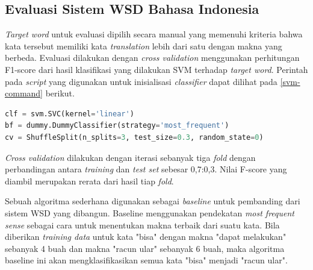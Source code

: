 \subsection{Evaluasi Sistem WSD Bahasa Indonesia}
\textit{Target word} untuk evaluasi dipilih secara manual yang memenuhi kriteria bahwa kata tersebut memiliki kata \textit{translation} lebih dari satu dengan makna yang berbeda. Evaluasi dilakukan dengan \textit{cross validation} menggunakan perhitungan F1-score dari hasil klasifikasi yang dilakukan SVM terhadap \textit{target word}. Perintah pada \textit{script} yang digunakan untuk inisialisasi \textit{classifier} dapat dilihat pada \ref{svm-command} berikut.

\begin{lstlisting}[language=python, caption={Perintah SVM, baseline, dan \textit{cross validation}}, label={svm-command}]
clf = svm.SVC(kernel='linear')
bf = dummy.DummyClassifier(strategy='most_frequent')
cv = ShuffleSplit(n_splits=3, test_size=0.3, random_state=0)
\end{lstlisting}


\textit{Cross validation} dilakukan dengan iterasi sebanyak tiga \textit{fold} dengan perbandingan antara \textit{training} dan \textit{test set} sebesar 0,7:0,3. Nilai F-score yang diambil merupakan rerata dari hasil tiap \textit{fold}.

Sebuah algoritma sederhana digunakan sebagai \textit{baseline} untuk pembanding dari sistem WSD yang dibangun. Baseline menggunakan pendekatan \textit{most frequent sense} sebagai cara untuk menentukan makna terbaik dari suatu kata. Bila diberikan \textit{training data} untuk kata "bisa" dengan makna "dapat melakukan" sebanyak 4 buah dan makna "racun ular" sebanyak 6 buah, maka algoritma baseline ini akan mengklasifikasikan semua kata "bisa" menjadi "racun ular".

